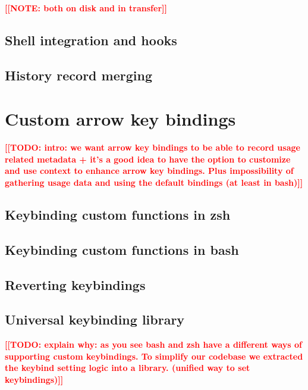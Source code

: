 \documentclass[thesis=M,english]{FITthesis}[2012/10/20]
\newcommand{\todotext}[1]{\textcolor{red}{\textbf{[[#1]]}}}
\newcommand{\blind}[1][1]{\textcolor{mygray}{\Blindtext[#1][1]}}
\begin{document}
\todotext{NOTE: both on disk and in transfer}

\blind

\subsection{Shell integration and hooks}

\blind

\subsection{History record merging}

\blind

\section{Custom arrow key bindings}

\todotext{TODO: intro: we want arrow key bindings to be able to record usage related metadata + it's a good idea to have the option to customize and use context to enhance arrow key bindings. Plus impossibility of gathering usage data and using the default bindings (at least in bash)}

\blind

\subsection{Keybinding custom functions in zsh}

\blind

\subsection{Keybinding custom functions in bash}

\blind

\subsection{Reverting keybindings}

\blind

\subsection{Universal keybinding library}
\todotext{TODO: explain why: as you see bash and zsh have a different ways of supporting custom keybindings. To simplify our codebase we extracted the keybind setting logic into a library. (unified way to set keybindings)}
\end{document}
